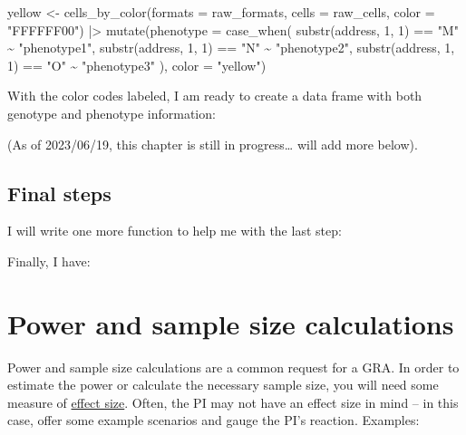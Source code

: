 \documentclass[
]{book}
\newenvironment{Shaded}{\begin{snugshade}}{\end{snugshade}}
\newcommand{\AttributeTok}[1]{\textcolor[rgb]{0.77,0.63,0.00}{#1}}
\newcommand{\DecValTok}[1]{\textcolor[rgb]{0.00,0.00,0.81}{#1}}
\newcommand{\FunctionTok}[1]{\textcolor[rgb]{0.00,0.00,0.00}{#1}}
\newcommand{\NormalTok}[1]{#1}
\newcommand{\OtherTok}[1]{\textcolor[rgb]{0.56,0.35,0.01}{#1}}
\newcommand{\SpecialCharTok}[1]{\textcolor[rgb]{0.00,0.00,0.00}{#1}}
\newcommand{\StringTok}[1]{\textcolor[rgb]{0.31,0.60,0.02}{#1}}
\begin{document}
\begin{Shaded}
\begin{Highlighting}[]
\NormalTok{yellow }\OtherTok{\textless{}{-}} \FunctionTok{cells\_by\_color}\NormalTok{(}\AttributeTok{formats =}\NormalTok{ raw\_formats,}
                         \AttributeTok{cells =}\NormalTok{ raw\_cells,}
                         \AttributeTok{color =} \StringTok{"FFFFFF00"}\NormalTok{) }\SpecialCharTok{|\textgreater{}} 
  \FunctionTok{mutate}\NormalTok{(}\AttributeTok{phenotype =} \FunctionTok{case\_when}\NormalTok{(}
    \FunctionTok{substr}\NormalTok{(address, }\DecValTok{1}\NormalTok{, }\DecValTok{1}\NormalTok{) }\SpecialCharTok{==} \StringTok{"M"} \SpecialCharTok{\textasciitilde{}} \StringTok{"phenotype1"}\NormalTok{,}
    \FunctionTok{substr}\NormalTok{(address, }\DecValTok{1}\NormalTok{, }\DecValTok{1}\NormalTok{) }\SpecialCharTok{==} \StringTok{"N"} \SpecialCharTok{\textasciitilde{}} \StringTok{"phenotype2"}\NormalTok{,}
    \FunctionTok{substr}\NormalTok{(address, }\DecValTok{1}\NormalTok{, }\DecValTok{1}\NormalTok{) }\SpecialCharTok{==} \StringTok{"O"} \SpecialCharTok{\textasciitilde{}} \StringTok{"phenotype3"}
\NormalTok{  ),}
  \AttributeTok{color =} \StringTok{"yellow"}\NormalTok{)}
\end{Highlighting}
\end{Shaded}

With the color codes labeled, I am ready to create a data frame with both genotype and phenotype information:

(As of 2023/06/19, this chapter is still in progress\ldots{} will add more below).

\hypertarget{final-steps}{%
\section{Final steps}\label{final-steps}}

I will write one more function to help me with the last step:

Finally, I have:

\hypertarget{power-and-sample-size-calculations}{%
\chapter{Power and sample size calculations}\label{power-and-sample-size-calculations}}

Power and sample size calculations are a common request for a GRA. In order to estimate the power or calculate the necessary sample size, you will need some measure of \href{https://en.wikipedia.org/wiki/Effect_size}{effect size}. Often, the PI may not have an effect size in mind -- in this case, offer some example scenarios and gauge the PI's reaction. Examples:
\end{document}
